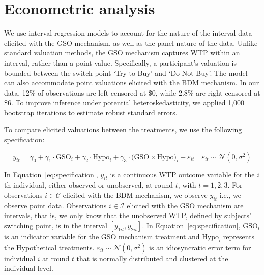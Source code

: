 \documentclass[12pt]{article}
\begin{document}


\section{Econometric analysis}
\label{Econometric}
We use interval regression models to account for the nature of the interval data elicited with the GSO mechanism, as well as the panel nature of the data. Unlike standard valuation methods, the GSO mechanism captures WTP within an interval, rather than a point value. Specifically, a participant's valuation is bounded between the switch point `Try to Buy' and `Do Not Buy'. The model can also accommodate point valuations elicited with the BDM mechanism. In our data, 12\% of observations are left censored at \$0, while 2.8\% are right censored at \$6. To improve inference under potential heteroskedasticity, we applied 1,000 bootstrap iterations to estimate robust standard errors.

To compare elicited valuations between the treatments, we use the following specification:
\vspace{-1cm}

\begin{equation}\label{eq:specification}
y_{it} = \gamma_0 + \gamma_1 \cdot \text{GSO}_i + \gamma_2 \cdot \text{Hypo}_i + \gamma_3 \cdot \text{(GSO} \times \text{Hypo)}_i +  \varepsilon_{it} 
\quad \varepsilon_{it} \sim \mathcal{N}(0, \sigma^2)
\end{equation}


In Equation~\ref{eq:specification}, $y_{it}$ is a continuous WTP outcome variable for the $i$th individual, either observed or unobserved, at round $t$, with $t = 1, 2, 3$. For observations $i \in \mathcal{C}$ elicited with the BDM mechanism, we observe $y_{it}$ i.e., we observe point data. Observations $i\in \mathcal{I}$ elicited with the GSO mechanism are intervals, that is, we only know that the unobserved WTP, defined by subjects' switching point, is in the interval $[y_{1it}, y_{2it}]$. In Equation~\ref{eq:specification}, $\text{GSO}_i$ is an indicator variable for the GSO mechanism treatment and $\text{Hypo}_i$ represents the Hypothetical treatments. $\varepsilon_{it} \sim \mathcal{N}(0, \sigma^2)$ is an idiosyncratic error term for individual $i$ at round $t$ that is normally distributed and clustered at the individual level.
\end{document}

